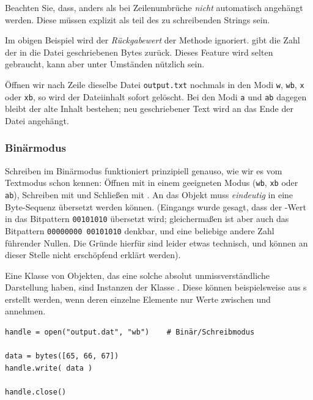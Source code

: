 Beachten Sie, dass, anders als bei  Zeilenumbrüche \emph{nicht} automatisch angehängt werden. Diese müssen explizit als  teil des zu schreibenden Strings sein.

Im obigen Beispiel wird der \emph{Rückgabewert} der Methode ignoriert.  gibt die Zahl der in die Datei geschriebenen Bytes zurück. Dieses Feature wird selten gebraucht, kann aber unter Umständen nützlich sein.

Öffnen wir nach Zeile dieselbe Datei \texttt{output.txt} nochmals in den Modi \texttt{w}, \texttt{wb}, \texttt{x} oder \texttt{xb}, so wird der Dateiinhalt sofort gelöscht. Bei den Modi \texttt{a} und \texttt{ab} dagegen bleibt der alte Inhalt bestehen; neu geschriebener Text wird an das Ende der Datei angehängt.

\subsubsection{Binärmodus}
Schreiben im Binärmodus funktioniert prinzipiell genauso, wie wir es vom Textmodus schon kennen: Öffnen mit  in einem geeigneten Modus (\texttt{wb},  \texttt{xb} oder \texttt{ab}), Schreiben mit  und Schließen mit . An das Objekt  muss \emph{eindeutig} in eine Byte-Sequenz übersetzt werden können. (Eingangs wurde gesagt, dass \eg der -Wert  in das Bitpattern \texttt{00101010} übersetzt wird; gleichermaßen ist aber auch das Bitpattern \texttt{00000000 00101010} denkbar, und eine beliebige andere Zahl führender Nullen. Die Gründe hierfür sind leider etwas technisch, und können an dieser Stelle nicht erschöpfend erklärt werden).

Eine Klasse von Objekten, das eine solche absolut unmissverständliche Darstellung haben, sind Instanzen der Klasse . Diese können beispielsweise aus s erstellt werden, wenn deren einzelne Elemente nur Werte zwischen  und  annehmen.

\begin{codebox}
\begin{verbatim}
handle = open("output.dat", "wb")    # Binär/Schreibmodus

data = bytes([65, 66, 67])
handle.write( data )

handle.close()
\end{verbatim}
\end{codebox}

